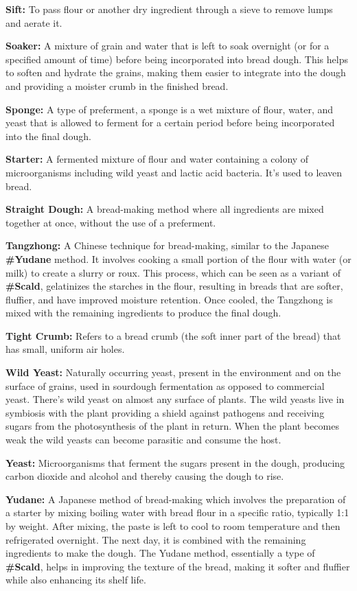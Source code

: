\textbf{Sift:} To pass flour or another dry ingredient through a sieve to remove lumps
and aerate it.

\textbf{Soaker:} A mixture of grain and water that is left to soak overnight (or for a
specified amount of time) before being incorporated into bread dough. This helps to
soften and hydrate the grains, making them easier to integrate into the dough and
providing a moister crumb in the finished bread.

\textbf{Sponge:} A type of preferment, a sponge is a wet mixture of flour, water, and
yeast that is allowed to ferment for a certain period before being incorporated into
the final dough.

\textbf{Starter:} A fermented mixture of flour and water containing a colony of
microorganisms including wild yeast and lactic acid bacteria. It's used to leaven
bread.

\textbf{Straight Dough:} A bread-making method where all ingredients are mixed
together at once, without the use of a preferment.

\textbf{Tangzhong:} A Chinese technique for bread-making, similar to the
Japanese \textbf{\#Yudane} method. It involves cooking a small portion of the flour
with water (or milk) to create a slurry or roux. This process, which can be seen as a
variant of \textbf{\#Scald}, gelatinizes the starches in the flour, resulting in breads
that are softer, fluffier, and have improved moisture retention. Once cooled, the
Tangzhong is mixed with the remaining ingredients to produce the final dough.

\textbf{Tight Crumb:} Refers to a bread crumb (the soft inner part of the bread) that
has small, uniform air holes.

\textbf{Wild Yeast:} Naturally occurring yeast, present in the environment and on the
surface of grains, used in sourdough fermentation as opposed to commercial yeast.
There’s wild yeast on almost any surface of plants. The wild yeasts live in symbiosis
with the plant providing a shield against pathogens and receiving sugars from the
photosynthesis of the plant in return. When the plant becomes weak the wild yeasts
can become parasitic and consume the host.

\textbf{Yeast:} Microorganisms that ferment the sugars present in the dough, producing
carbon dioxide and alcohol and thereby causing the dough to rise.

\textbf{Yudane:} A Japanese method of bread-making which involves the preparation
of a starter by mixing boiling water with bread flour in a specific ratio, typically 1:1
by weight. After mixing, the paste is left to cool to room temperature and then
refrigerated overnight. The next day, it is combined with the remaining ingredients
to make the dough. The Yudane method, essentially a type of \textbf{\#Scald}, helps in
improving the texture of the bread, making it softer and fluffier while also enhancing
its shelf life.
